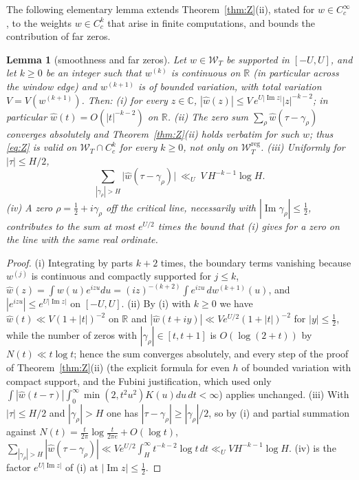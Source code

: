 \documentclass[11pt]{amsart}
\newtheorem{lemma}[theorem]{Lemma}
\theoremstyle{definition}
\theoremstyle{remark}
\newcommand{\C}{\mathbb C}
\newcommand{\R}{\mathbb R}
\newcommand{\Iml}{\operatorname{Im}}
\newcommand{\wh}{\widehat w}
\newcommand{\Wcl}{\mathcal W_T}
\begin{document}
The following elementary lemma extends Theorem~\ref{thm:Z}(ii), stated for $w\in C_c^\infty$, to the weights $w\in C^k_c$ that arise in finite computations, and bounds the contribution of far zeros.

\begin{lemma}[smoothness and far zeros]\label{lem:smooth}
Let $w\in\Wcl$ be supported in $[-U,U]$, and let $k\ge0$ be an integer such that $w^{(k)}$ is
continuous on $\R$ (in particular across the window edge) and $w^{(k+1)}$ is of bounded variation,
with total variation $V=V(w^{(k+1)})$. Then:
\emph{(i)} for every $z\in\C$, $|\wh(z)|\le V\,e^{U|\Iml z|}|z|^{-k-2}$; in particular
$\wh(t)=O(|t|^{-k-2})$ on $\R$.
\emph{(ii)} The zero sum $\sum_\rho\wh(\tau-\gamma_\rho)$ converges absolutely and
Theorem~\ref{thm:Z}(ii) holds verbatim for such $w$; thus \eqref{eq:Z} is valid on
$\Wcl\cap C_c^k$ for every $k\ge0$, not only on $\Wcl^{\mathrm{reg}}$.
\emph{(iii)} Uniformly for $|\tau|\le H/2$,
\[
\sum_{|\gamma_\rho|>H}\big|\wh(\tau-\gamma_\rho)\big|\ \ll_{U}\ V\,H^{-k-1}\log H .
\]
\emph{(iv)} A zero $\rho=\frac12+i\gamma_\rho$ off the critical line, necessarily with
$|\Iml\gamma_\rho|\le\frac12$, contributes to the sum at most $e^{U/2}$ times the bound that
\emph{(i)} gives for a zero on the line with the same real ordinate.
\end{lemma}
\begin{proof}
(i) Integrating by parts $k+2$ times, the boundary terms vanishing because $w^{(j)}$ is continuous
and compactly supported for $j\le k$,
$\wh(z)=\int w(u)e^{izu}du=(iz)^{-(k+2)}\int e^{izu}\,dw^{(k+1)}(u)$, and $|e^{izu}|\le e^{U|\Iml z|}$
on $[-U,U]$. (ii) By (i) with $k\ge0$ we have $\wh(t)\ll V(1+|t|)^{-2}$ on $\R$ and
$|\wh(t+iy)|\ll Ve^{U/2}(1+|t|)^{-2}$ for $|y|\le\frac12$, while the number of zeros with
$|\gamma_\rho|\in[t,t+1]$ is $O(\log(2+t))$ by $N(t)\ll t\log t$; hence the sum converges absolutely,
and every step of the proof of Theorem~\ref{thm:Z}(ii) (the explicit formula for even $h$ of bounded
variation with compact support, and the Fubini justification, which used only
$\int|\wh(t-\tau)|\int_0^\infty\min(2,t^2u^2)K(u)du\,dt<\infty$) applies unchanged.
(iii) With $|\tau|\le H/2$ and $|\gamma_\rho|>H$ one has $|\tau-\gamma_\rho|\ge|\gamma_\rho|/2$,
so by (i) and partial summation against $N(t)=\frac t{2\pi}\log\frac t{2\pi e}+O(\log t)$,
$\sum_{|\gamma_\rho|>H}|\wh(\tau-\gamma_\rho)|\ll Ve^{U/2}\int_H^\infty t^{-k-2}\log t\,dt
\ll_UV H^{-k-1}\log H$. (iv) is the factor $e^{U|\Iml z|}$ of (i) at $|\Iml z|\le\frac12$.
\end{proof}
\end{document}
